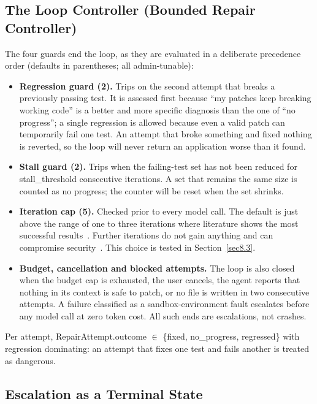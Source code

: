 \documentclass[pdflatex,sn-mathphys-num]{sn-jnl}%
\theoremstyle{thmstyleone}%
\theoremstyle{thmstyletwo}%
\theoremstyle{thmstylethree}%
\begin{document}
\subsection{The Loop Controller (Bounded Repair Controller)}\label{sec5.3}

The four guards end the loop, as they are evaluated in a deliberate precedence order (defaults in parentheses; all admin-tunable):

\begin{itemize}
\item \textbf{Regression guard (2).} Trips on the second attempt that breaks a previously passing test. It is assessed first because ``my patches keep breaking working code'' is a better and more specific diagnosis than the one of ``no progress''; a single regression is allowed because even a valid patch can temporarily fail one test. An attempt that broke something and fixed nothing is reverted, so the loop will never return an application worse than it found.
\item \textbf{Stall guard (2).} Trips when the failing-test set has not been reduced for stall\_threshold consecutive iterations. A set that remains the same size is counted as no progress; the counter will be reset when the set shrinks.
\item \textbf{Iteration cap (5).} Checked prior to every model call. The default is just above the range of one to three iterations where literature shows the most successful results~\cite{r09kiecker,r10arimbur}. Further iterations do not gain anything and can compromise security~\cite{r05shukla}. This choice is tested in Section~\ref{sec8.3}.
\item \textbf{Budget, cancellation and blocked attempts.} The loop is also closed when the budget cap is exhausted, the user cancels, the agent reports that nothing in its context is safe to patch, or no file is written in two consecutive attempts. A failure classified as a sandbox-environment fault escalates before any model call at zero token cost. All such ends are escalations, not crashes.
\end{itemize}

Per attempt, RepairAttempt.outcome $\in$ \{fixed, no\_progress, regressed\} with regression dominating: an attempt that fixes one test and fails another is treated as dangerous.

\subsection{Escalation as a Terminal State}\label{sec5.4}
\end{document}
